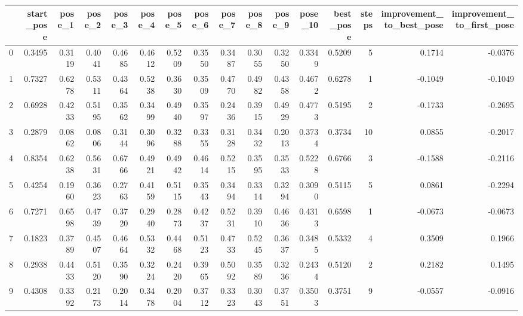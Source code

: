 \begin{tabular}{lrrrrrrrrrrrrrrr}
\toprule
{} &  start\_pose &  pose\_1 &  pose\_2 &  pose\_3 &  pose\_4 &  pose\_5 &  pose\_6 &  pose\_7 &  pose\_8 &  pose\_9 &  pose\_10 &  best\_pose &  steps &  improvement\_to\_best\_pose &  improvement\_to\_first\_pose \\
\midrule
0   &      0.3495 &  0.3119 &  0.4041 &  0.4685 &  0.4612 &  0.5209 &  0.3550 &  0.3487 &  0.3055 &  0.3250 &   0.3349 &     0.5209 &      5 &                    0.1714 &                    -0.0376 \\
1   &      0.7327 &  0.6278 &  0.5311 &  0.4364 &  0.5238 &  0.3630 &  0.3509 &  0.4770 &  0.4982 &  0.4358 &   0.4672 &     0.6278 &      1 &                   -0.1049 &                    -0.1049 \\
2   &      0.6928 &  0.4233 &  0.5195 &  0.3562 &  0.3499 &  0.4940 &  0.3597 &  0.2436 &  0.3915 &  0.4929 &   0.4773 &     0.5195 &      2 &                   -0.1733 &                    -0.2695 \\
3   &      0.2879 &  0.0862 &  0.0806 &  0.3144 &  0.3096 &  0.3288 &  0.3355 &  0.3128 &  0.3432 &  0.2013 &   0.3734 &     0.3734 &     10 &                    0.0855 &                    -0.2017 \\
4   &      0.8354 &  0.6238 &  0.5631 &  0.6766 &  0.4921 &  0.4942 &  0.4614 &  0.5215 &  0.3595 &  0.3533 &   0.5228 &     0.6766 &      3 &                   -0.1588 &                    -0.2116 \\
5   &      0.4254 &  0.1960 &  0.3623 &  0.2763 &  0.4159 &  0.5115 &  0.3543 &  0.3494 &  0.3314 &  0.3294 &   0.3090 &     0.5115 &      5 &                    0.0861 &                    -0.2294 \\
6   &      0.7271 &  0.6598 &  0.4739 &  0.3720 &  0.2940 &  0.2873 &  0.4237 &  0.5231 &  0.3910 &  0.4636 &   0.4313 &     0.6598 &      1 &                   -0.0673 &                    -0.0673 \\
7   &      0.1823 &  0.3789 &  0.4507 &  0.4664 &  0.5332 &  0.4468 &  0.5123 &  0.4733 &  0.5245 &  0.3637 &   0.3485 &     0.5332 &      4 &                    0.3509 &                     0.1966 \\
8   &      0.2938 &  0.4433 &  0.5120 &  0.3590 &  0.3224 &  0.2420 &  0.3965 &  0.5092 &  0.3589 &  0.3236 &   0.2434 &     0.5120 &      2 &                    0.2182 &                     0.1495 \\
9   &      0.4308 &  0.3392 &  0.2173 &  0.2014 &  0.3478 &  0.2004 &  0.3712 &  0.3323 &  0.3043 &  0.3751 &   0.3503 &     0.3751 &      9 &                   -0.0557 &                    -0.0916 \\

\end{tabular}
